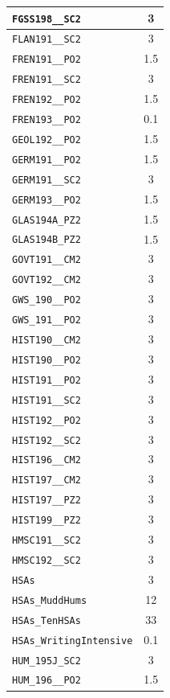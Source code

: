 \begin{longtable}{|p{}|c|}
    \verb|FGSS198__SC2| & 3\\\hline
    \verb|FLAN191__SC2| & 3\\\hline
    \verb|FREN191__PO2| & 1.5\\\hline
    \verb|FREN191__SC2| & 3\\\hline
    \verb|FREN192__PO2| & 1.5\\\hline
    \verb|FREN193__PO2| & 0.1\\\hline
    \verb|GEOL192__PO2| & 1.5\\\hline
    \verb|GERM191__PO2| & 1.5\\\hline
    \verb|GERM191__SC2| & 3\\\hline
    \verb|GERM193__PO2| & 1.5\\\hline
    \verb|GLAS194A_PZ2| & 1.5\\\hline
    \verb|GLAS194B_PZ2| & 1.5\\\hline
    \verb|GOVT191__CM2| & 3\\\hline
    \verb|GOVT192__CM2| & 3\\\hline
    \verb|GWS_190__PO2| & 3\\\hline
    \verb|GWS_191__PO2| & 3\\\hline
    \verb|HIST190__CM2| & 3\\\hline
    \verb|HIST190__PO2| & 3\\\hline
    \verb|HIST191__PO2| & 3\\\hline
    \verb|HIST191__SC2| & 3\\\hline
    \verb|HIST192__PO2| & 3\\\hline
    \verb|HIST192__SC2| & 3\\\hline
    \verb|HIST196__CM2| & 3\\\hline
    \verb|HIST197__CM2| & 3\\\hline
    \verb|HIST197__PZ2| & 3\\\hline
    \verb|HIST199__PZ2| & 3\\\hline
    \verb|HMSC191__SC2| & 3\\\hline
    \verb|HMSC192__SC2| & 3\\\hline
    \verb|HSAs| & 3\\\hline
    \verb|HSAs_MuddHums| & 12\\\hline
    \verb|HSAs_TenHSAs| & 33\\\hline
    \verb|HSAs_WritingIntensive| & 0.1\\\hline
    \verb|HUM_195J_SC2| & 3\\\hline
    \verb|HUM_196__PO2| & 1.5\\\hline

\end{longtable}
